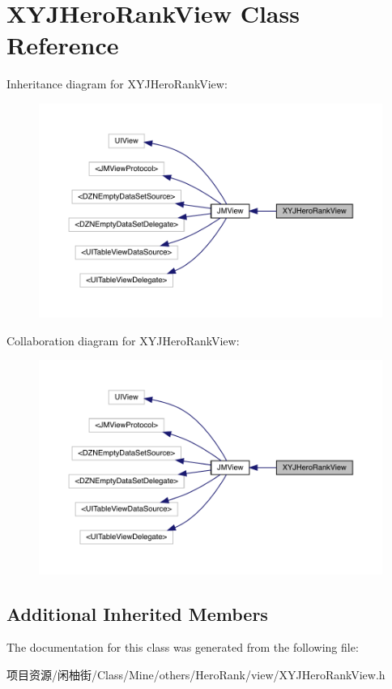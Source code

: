 \hypertarget{interface_x_y_j_hero_rank_view}{}\section{X\+Y\+J\+Hero\+Rank\+View Class Reference}
\label{interface_x_y_j_hero_rank_view}


Inheritance diagram for X\+Y\+J\+Hero\+Rank\+View\+:\nopagebreak
\begin{figure}[H]
\begin{center}
\leavevmode
\includegraphics[width=350pt]{interface_x_y_j_hero_rank_view__inherit__graph}
\end{center}
\end{figure}


Collaboration diagram for X\+Y\+J\+Hero\+Rank\+View\+:\nopagebreak
\begin{figure}[H]
\begin{center}
\leavevmode
\includegraphics[width=350pt]{interface_x_y_j_hero_rank_view__coll__graph}
\end{center}
\end{figure}
\subsection*{Additional Inherited Members}


The documentation for this class was generated from the following file\+:\begin{DoxyCompactItemize}
\item 
项目资源/闲柚街/\+Class/\+Mine/others/\+Hero\+Rank/view/X\+Y\+J\+Hero\+Rank\+View.\+h\end{DoxyCompactItemize}
